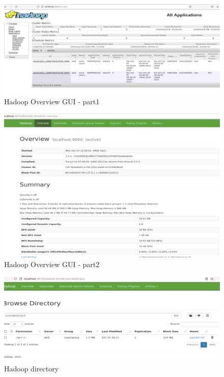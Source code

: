 \documentclass[11pt]{article}
\begin{document}
\begin{figure}
    \includegraphics[width=\linewidth]{hadoop_gui1.png}
    \caption{Hadoop Overview GUI - part1}
    \label{fig:hadoopgui1}
\end{figure}

\begin{figure}
    \includegraphics[width=\linewidth]{hadoop_gui2.png}
    \caption{Hadoop Overview GUI - part2}
    \label{fig:hadoopgui2}
\end{figure}

\begin{figure}
    \includegraphics[width=\linewidth]{hadoop_gui3.png}
    \caption{Hadoop directory}
    \label{fig:hadoopgui3}
\end{figure}
\end{document}
